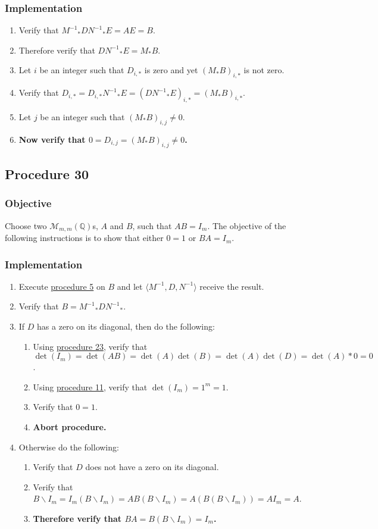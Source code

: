 \documentclass[twocolumn]{article}
\begin{document}
			\subsubsection{Implementation}
				\begin{enumerate}
					\item Verify that ${M^{-1}}_*D{N^{-1}}_*E=AE=B$.
					\item Therefore verify that $D{N^{-1}}_*E=M_*B$.
					\item Let $i$ be an integer such that $D_{i,*}$ is zero and yet $(M_*B)_{i,*}$ is not zero.
					\item Verify that $D_{i,*}=D_{i,*}{N^{-1}}_*E=(D{N^{-1}}_*E)_{i,*}=(M_*B)_{i,*}$.
					\item Let $j$ be an integer such that $(M_*B)_{i,j}\ne 0$.
					\item \textbf{Now verify that $0=D_{i,j}=(M_*B)_{i,j}\ne 0$.}
				\end{enumerate}
		\subsection{Procedure 30}\label{sec:procedure 30}
			\subsubsection{Objective}
				Choose two $\mathcal{M}_{m,m}(\mathbb{Q})$s, $A$ and $B$, such that $AB=I_m$. The objective of the following instructions is to show that either $0=1$ or $BA=I_m$.
			\subsubsection{Implementation}
				\begin{enumerate}
					\item Execute \hyperref[sec:procedure 5]{procedure 5} on $B$ and let $\langle M^{-1},D,N^{-1}\rangle$ receive the result.
					\item Verify that $B={M^{-1}}_*D{N^{-1}}_*$.
					\item If $D$ has a zero on its diagonal, then do the following:
					\begin{enumerate}
						\item Using \hyperref[sec:procedure 23]{procedure 23}, verify that $\det(I_m)=\det(AB)=\det(A)\det(B)=\det(A)\det(D)=\det(A)*0=0$.
						\item Using \hyperref[sec:procedure 11]{procedure 11}, verify that $\det(I_m)=1^m=1$.
						\item Verify that $0=1$.
						\item \textbf{Abort procedure.}
					\end{enumerate}
					\item Otherwise do the following:
					\begin{enumerate}
						\item Verify that $D$ does not have a zero on its diagonal.
						\item Verify that $B\backslash I_m=I_m(B\backslash I_m)=AB(B\backslash I_m)=A(B(B\backslash I_m))=AI_m=A$.
						\item \textbf{Therefore verify that $BA=B(B\backslash I_m)=I_m$.}
					\end{enumerate}
				\end{enumerate}
\end{document}
